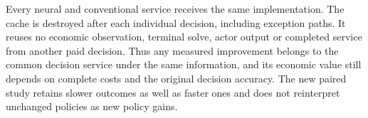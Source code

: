 Every neural and conventional service receives the same implementation.
The cache is destroyed after each individual decision, including exception
paths.  It reuses no economic observation, terminal solve, actor output or
completed service from another paid decision.  Thus any measured improvement
belongs to the common decision service under the same information, and its
economic value still depends on complete costs and the original decision
accuracy.  The new paired study retains slower outcomes as well as faster
ones and does not reinterpret unchanged policies as new policy gains.
